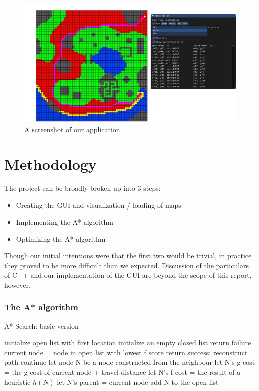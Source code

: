 \documentclass{article}
\begin{document}
\begin{figure}[h!]
\includegraphics[width=\textwidth]{astar}
\caption{A screenshot of our application}
\end{figure}
\newpage
\section{Methodology}
The project can be broadly broken up into 3 steps:
\begin{itemize}
    \item Creating the GUI and visualization / loading of maps
    \item Implementing the A* algorithm
    \item Optimizing the A* algorithm
\end{itemize}
Though our initial intentions were that the first two would be trivial, in practice they proved to be more difficult than we expected. Discussion of the particulars of C++ and our implementation of the GUI are beyond the scope of this report, however.
\subsubsection*{The A* algorithm}
\begin{algorithm}
\caption{A* Search: basic version}
\begin{algorithmic}
\STATE initialize open list with first location
\STATE initialize an empty closed list
return failure
\ENDIF \\
\STATE current node = node in open list with lowest f score
return success: reconstruct path
\ENDIF
{}
\STATE continue 
\ENDIF
{}
\STATE let node N be a node constructed from the neighbour
\STATE let N's g-cost = the g-cost of current node + travel distance
\STATE let N's f-cost = the result of a heuristic $h(N)$
\STATE let N's parent = current node
\STATE add N to the open list
\ENDFOR
\ENDFOR
\STATE 
\end{algorithmic}
\end{algorithm}
\end{document}
